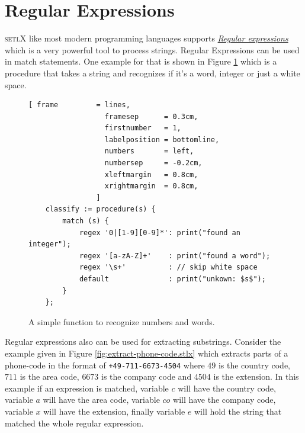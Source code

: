 \documentclass[11pt]{report}
\begin{document}
\section{Regular Expressions}
\textsc{setlX} like most modern programming languages supports \href{http://en.wikipedia.org/wiki/Regular_expression}{\emph{Regular expressions}} which is a very powerful tool to process strings. Regular Expressions can be used in match statements. One example for that is shown in Figure \ref{fig:regexp.stlx} which is a procedure that takes a string and recognizes if it's a word, integer or just a white space.

\begin{figure}[!ht]
\centering
\begin{Verbatim}[ frame         = lines, 
                  framesep      = 0.3cm, 
                  firstnumber   = 1,
                  labelposition = bottomline,
                  numbers       = left,
                  numbersep     = -0.2cm,
                  xleftmargin   = 0.8cm,
                  xrightmargin  = 0.8cm,
                ]
    classify := procedure(s) {
        match (s) {
            regex '0|[1-9][0-9]*': print("found an integer");
            regex '[a-zA-Z]+'    : print("found a word");
            regex '\s+'          : // skip white space
            default              : print("unkown: $s$");
        }
    };
\end{Verbatim}
\vspace*{-0.3cm}
\caption{A simple function to recognize numbers and words.}
\label{fig:regexp.stlx}
\end{figure} 
Regular expressions also can be used for extracting substrings. Consider the example given in Figure \ref{fig:extract-phone-code.stlx} which extracts parts of a phone-code in the format of \texttt{+49-711-6673-4504} where $49$ is the country code, $711$ is the area code, $6673$ is the company code and $4504$ is the extension. In this example if an expression is matched, variable $c$ will have the country code, variable $a$ will have the area code, variable $co$ will have the company code, variable $x$ will have the extension, finally variable $e$ will hold the string that matched the whole regular expression.
\end{document}
